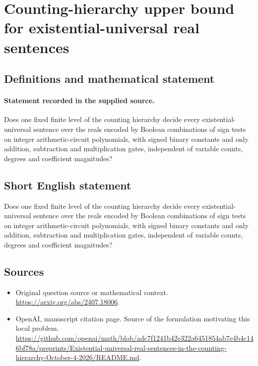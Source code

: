 \documentclass[11pt]{article}
\begin{document}
\section*{Counting-hierarchy upper bound for existential-universal real sentences}\label{statement}
\subsection{Definitions and mathematical statement}
\paragraph{Statement recorded in the supplied source.}
Does one fixed finite level of the counting hierarchy decide every existential-universal sentence over the reals encoded by Boolean combinations of sign tests on integer arithmetic-circuit polynomials, with signed binary constants and only addition, subtraction and multiplication gates, independent of variable counts, degrees and coefficient magnitudes?
\subsection{Short English statement}
Does one fixed finite level of the counting hierarchy decide every existential-universal sentence over the reals encoded by Boolean combinations of sign tests on integer arithmetic-circuit polynomials, with signed binary constants and only addition, subtraction and multiplication gates, independent of variable counts, degrees and coefficient magnitudes?
\subsection{Sources}
\begin{itemize}
\item[S1] Original question source or mathematical context.
\url{https://arxiv.org/abs/2407.18006}.
\item[S2] OpenAI, manuscript citation page. Source of the formulation motivating this local problem.
\url{https://github.com/openai/math/blob/adc7f1241b42e322a6451854ab7e4b4c146bf78a/preprints/Existential-universal-real-sentences-in-the-counting-hierarchy-October-4-2026/README.md}.
\end{itemize}
\end{document}
